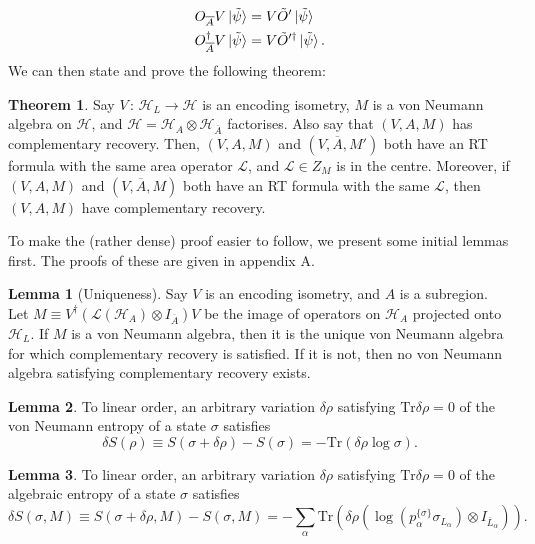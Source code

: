 \documentclass[12pt,a4paper]{report}
\numberwithin{equation}{section}
\newcommand{\ol}[1]{\overline{#1}}
\newcommand{\tr}{\text{Tr}}
\theoremstyle{definition}
\theoremstyle{theorem}
\newtheorem{theorem}{Theorem}[section]
\theoremstyle{theorem}
\newtheorem{lemma}{Lemma}[section]
\theoremstyle{example}
\theoremstyle{definition}
\begin{document}
\begin{equation}
	\begin{aligned}
		O_{\ol{A}}V\ket{\tilde{\psi}}&=V\tilde{O}'\ket{\tilde{\psi}}\\
		O_{\ol{A}}^{\dagger}V\ket{\tilde{\psi}}&=V\tilde{O}'^{\dagger}\ket{\tilde{\psi}}.
	\end{aligned}
\end{equation}
We can then state and prove the following theorem:
\begin{theorem}\label{bij}
	Say $V\,:\,\mathcal{H}_{L}\to\mathcal{H}$ is an encoding isometry, $M$ is a von Neumann algebra on $\mathcal{H}$, and $\mathcal{H}=\mathcal{H}_{A}\otimes\mathcal{H}_{\ol{A}}$ factorises. Also say that $(V,A,M)$ has complementary recovery. Then, $(V,A,M)$ and $(V,\ol{A},M')$ both have an RT formula with the same area operator $\mathcal{L}$, and $\mathcal{L}\in Z_{M}$ is in the centre. Moreover, if $(V,A,M)$ and $(V,\ol{A},M)$ both have an RT formula with the same $\mathcal{L}$, then $(V,A,M)$ have complementary recovery.
\end{theorem}
To make the (rather dense) proof easier to follow, we present some initial lemmas first. The proofs of these are given in appendix A.
\begin{lemma}[Uniqueness]\label{unique}
	Say $V$ is an encoding isometry, and $A$ is a subregion. Let $M\equiv V^{\dagger}(\mathcal{L}(\mathcal{H}_{A})\otimes I_{\ol{A}})V$ be the image of operators on $\mathcal{H}_{A}$ projected onto $\mathcal{H}_{L}$. If $M$ is a von Neumann algebra, then it is the unique von Neumann algebra for which complementary recovery is satisfied. If it is not, then no von Neumann algebra satisfying complementary recovery exists.
\end{lemma}
\begin{lemma}\label{vnae}
	To linear order, an arbitrary variation $\delta\rho$ satisfying $\tr\delta\rho=0$ of the von Neumann entropy of a state $\sigma$ satisfies
	\begin{equation}
		\delta S(\rho)\equiv S(\sigma+\delta\rho)-S(\sigma)=-\tr\left(\delta\rho\log\sigma\right).
	\end{equation} 
\end{lemma}
\begin{lemma}\label{vnae2}
	To linear order, an arbitrary variation $\delta\rho$ satisfying $\tr\delta\rho=0$ of the algebraic entropy of a state $\sigma$ satisfies
	\begin{equation}
		\delta S(\sigma,M)\equiv S(\sigma+\delta\rho,M)-S(\sigma,M)=-\sum_{\alpha}\tr\left(\delta\rho\left(\log\left( p_{\alpha}^{\{\sigma\}}\sigma_{L_{\alpha}}\right)\otimes I_{\ol{L}_{\alpha}}\right)\right).
	\end{equation}
\end{lemma}
\end{document}
